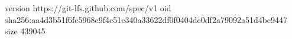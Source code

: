 version https://git-lfs.github.com/spec/v1
oid sha256:aa4d3b51f6fc5968e9f4c51c340a33622df0f0404de0df2a79092a51d4bc9447
size 439045
